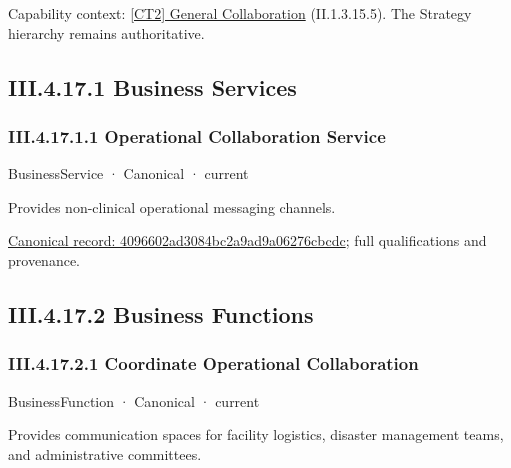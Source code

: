 {\small Capability context: \hyperref[element:3bb740e6db284112b054905c0c6c80be]{[CT2] General Collaboration} (II.1.3.15.5). The Strategy hierarchy remains authoritative.}\par
\subsection*{III.4.17.1 Business Services}
\label{navigation:III.4.17.1}

\subsubsection*{III.4.17.1.1 Operational Collaboration Service}
\label{navigation:III.4.17.1.1}

\label{element:4096602ad3084bc2a9ad9a06276cbcdc}
{\small BusinessService · Canonical · current}\par

Provides non-clinical operational messaging channels.


{\footnotesize \href{../../../../continuum/business/business-service/4096602ad3084bc2a9ad9a06276cbcdc.md}{Canonical record: 4096602ad3084bc2a9ad9a06276cbcdc}; full qualifications and provenance.}\par
\subsection*{III.4.17.2 Business Functions}
\label{navigation:III.4.17.2}

\subsubsection*{III.4.17.2.1 Coordinate Operational Collaboration}
\label{navigation:III.4.17.2.1}

\label{element:3b5604d966504661af2cb6654ae0de5c}
{\small BusinessFunction · Canonical · current}\par

Provides communication spaces for facility logistics, disaster management teams, and administrative committees.


